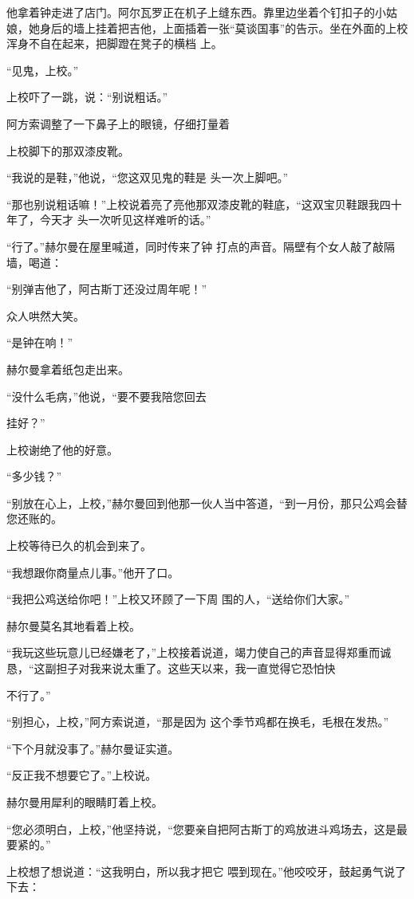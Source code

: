 \documentclass{article}
\begin{document}
他拿着钟走进了店门。阿尔瓦罗正在机子上缝东西。靠里边坐着个钉扣子的小姑娘，她身后的墙上挂着把吉他，上面插着一张“莫谈国事”的告示。坐在外面的上校浑身不自在起来，把脚蹬在凳子的横档
上。 


“见鬼，上校。” 


上校吓了一跳，说：“别说粗话。” 

阿方索调整了一下鼻子上的眼镜，仔细打量着

\newpage
上校脚下的那双漆皮靴。 

“我说的是鞋，”他说，“您这双见鬼的鞋是
头一次上脚吧。” 

“那也别说粗话嘛！”上校说着亮了亮他那双漆皮靴的鞋底，“这双宝贝鞋跟我四十年了，今天才
头一次听见这样难听的话。” 

“行了。”赫尔曼在屋里喊道，同时传来了钟
打点的声音。隔壁有个女人敲了敲隔墙，喝道： 


“别弹吉他了，阿古斯丁还没过周年呢！” 


众人哄然大笑。 


“是钟在响！” 


赫尔曼拿着纸包走出来。 

“没什么毛病，”他说，“要不要我陪您回去

\newpage
挂好？” 


上校谢绝了他的好意。 


“多少钱？” 

“别放在心上，上校，”赫尔曼回到他那一伙人当中答道，“到一月份，那只公鸡会替您还账的。


上校等待已久的机会到来了。 


“我想跟你商量点儿事。”他开了口。 


“我把公鸡送给你吧！”上校又环顾了一下周
围的人，“送给你们大家。” 


赫尔曼莫名其地看着上校。 

“我玩这些玩意儿已经嫌老了，”上校接着说道，竭力使自己的声音显得郑重而诚恳，“这副担子对我来说太重了。这些天以来，我一直觉得它恐怕快
\newpage

不行了。” 

“别担心，上校，”阿方索说道，“那是因为
这个季节鸡都在换毛，毛根在发热。” 


“下个月就没事了。”赫尔曼证实道。 


“反正我不想要它了。”上校说。 


赫尔曼用犀利的眼睛盯着上校。 

“您必须明白，上校，”他坚持说，“您要亲自把阿古斯丁的鸡放进斗鸡场去，这是最要紧的。”

上校想了想说道：“这我明白，所以我才把它
喂到现在。”他咬咬牙，鼓起勇气说了下去： 
\end{document}
